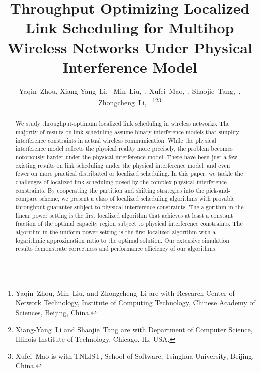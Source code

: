 \documentclass[journal]{IEEEtran}
\begin{document}
\title{Throughput Optimizing Localized Link Scheduling for Multihop Wireless Networks Under Physical Interference Model}

\author{Yaqin~Zhou,
       Xiang-Yang~Li,~
        Min~Liu,~,
        Xufei~Mao,~,
   Shaojie~Tang,~,
     Zhongcheng~Li,~
\thanks{Yaqin~Zhou, Min~Liu, and Zhongcheng~Li are with Research Center of Network Technology, Institute of Computing Technology, Chinese Academy of Sciences, Beijing, China.}\thanks{Xiang-Yang~Li and Shaojie~Tang are with Department of Computer Science, Illinois Institute of Technology, Chicago, IL, USA.}\thanks{Xufei~Mao is with TNLIST, School of Software, Tsinghua University, Beijing, China.}
}












\maketitle


\begin{abstract}
We study throughput-optimum localized link scheduling in  wireless networks. The majority of results on link scheduling assume binary interference models that simplify interference constraints in actual wireless communication. While the physical interference model reflects the physical reality more precisely, the problem becomes notoriously harder under the physical interference model. There have been just a few existing results on link scheduling under the physical interference model, and even fewer on more practical distributed or localized scheduling.  In this paper, we tackle the challenges of localized link scheduling posed by the complex physical interference constraints. By cooperating the partition and shifting strategies into the pick-and-compare scheme, we present a class of localized scheduling algorithms with provable throughput guarantee subject to physical interference constraints. The algorithm in the linear power setting is the first localized algorithm that achieves at least a constant fraction of the optimal capacity region subject to  physical interference constraints. The algorithm in the uniform power setting is  the first localized algorithm with a logarithmic approximation ratio to the optimal solution. Our extensive simulation results demonstrate correctness and performance efficiency of our algorithms.
\end{abstract}
\end{document}
